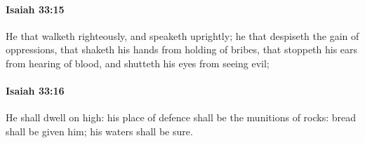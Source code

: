 		\paragraph{Isaiah 33:15} %
			\label{ISAIAH-33-15}

			He that walketh righteously, and speaketh uprightly; he that despiseth the gain of oppressions, that shaketh his hands from holding of bribes, that stoppeth his ears from hearing of blood, and shutteth his eyes from seeing evil;


		\paragraph{Isaiah 33:16} %
			\label{ISAIAH-33-16}

			He shall dwell on high: his place of defence shall be the munitions of rocks: bread shall be given him; his waters shall be sure.


